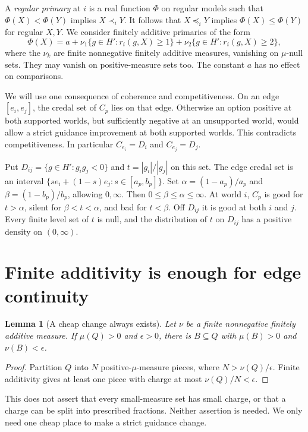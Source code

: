 \documentclass[11pt]{article}
\newtheorem{lemma}[theorem]{Lemma}
\theoremstyle{remark}\newtheorem{remark}[theorem]{Remark}
\begin{document}
A \emph{regular primary} at $i$ is a real function $\Phi$ on regular models
such that $\Phi(X)<\Phi(Y)$ implies $X\prec_iY$. It follows that
$X\preceq_iY$ implies $\Phi(X)\le\Phi(Y)$ for regular $X,Y$.
We consider finitely additive primaries of the form
\begin{equation}
 \Phi(X)=a+\nu_1\{g\in H':r_i(g,X)\ge1\}
             +\nu_2\{g\in H':r_i(g,X)\ge2\},
 \label{eq:primary}
\end{equation}
where the $\nu_k$ are finite nonnegative finitely additive measures,
vanishing on $\mu$-null sets. They may vanish on positive-measure sets too.
The constant $a$ has no effect on comparisons.

We will use one consequence of coherence and competitiveness. On an edge
$[e_i,e_j]$, the credal set of $C_p$ lies on that edge. Otherwise an option
positive at both supported worlds, but sufficiently negative at an
unsupported world, would allow a strict guidance improvement at both
supported worlds. This contradicts competitiveness. In particular
$C_{e_i}=D_i$ and $C_{e_j}=D_j$.

Put $D_{ij}=\{g\in H':g_ig_j<0\}$ and $t=|g_i|/|g_j|$ on this set.
The edge credal set is an interval
$\{s e_i+(1-s)e_j:s\in[a_p,b_p]\}$. Set
$\alpha=(1-a_p)/a_p$ and $\beta=(1-b_p)/b_p$, allowing $0,\infty$.
Then $0\le\beta\le\alpha\le\infty$. At world $i$, $C_p$ is good for
$t>\alpha$, silent for $\beta<t<\alpha$, and bad for $t<\beta$.
Off $D_{ij}$ it is good at both $i$ and $j$.
Every finite level set of $t$ is null, and the distribution of $t$ on
$D_{ij}$ has a positive density on $(0,\infty)$.

\section{Finite additivity is enough for edge continuity}

\begin{lemma}[A cheap change always exists]\label{lem:cheap}
Let $\nu$ be a finite nonnegative finitely additive measure. If $\mu(Q)>0$
and $\epsilon>0$, there is $B\subseteq Q$ with $\mu(B)>0$ and
$\nu(B)<\epsilon$.
\end{lemma}
\begin{proof}
Partition $Q$ into $N$ positive-$\mu$-measure pieces, where
$N>\nu(Q)/\epsilon$. Finite additivity gives at least one piece with
charge at most $\nu(Q)/N<\epsilon$.
\end{proof}

This does not assert that every small-measure set has small charge, or
that a charge can be split into prescribed fractions. Neither assertion
is needed. We only need one cheap place to make a strict guidance change.
\end{document}
